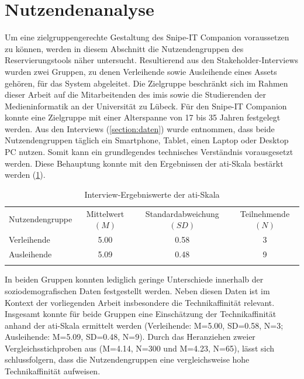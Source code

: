 \section{Nutzendenanalyse}
\label{section:Nutzenden}
Um eine zielgruppengerechte Gestaltung des Snipe-IT Companion voraussetzen zu können, werden in
diesem Abschnitt die Nutzendengruppen des Reservierungstools näher untersucht. Resultierend aus den
Stakeholder-Interviews wurden zwei Gruppen, zu denen Verleihende sowie Ausleihende eines Assets
gehören, für das System abgeleitet. Die Zielgruppe beschränkt sich im Rahmen dieser Arbeit auf die
Mitarbeitenden des \ac{imis} sowie die Studierenden der Medieninformatik an der Universität zu
Lübeck. Für den Snipe-IT Companion konnte eine Zielgruppe mit einer Alterspanne von 17 bis 35 Jahren
festgelegt werden. Aus den Interviews (\ref{section:daten}) wurde entnommen, dass beide
Nutzendengruppen täglich ein Smartphone, Tablet, einen Laptop oder Desktop PC nutzen. Somit kann ein
grundlegendes technisches Verständnis vorausgesetzt werden. Diese Behauptung konnte mit den
Ergebnissen der \ac{ati}-Skala bestärkt werden (\ref{table:ati}).

\begin{table}[h]
        \centering
        \caption{Interview-Ergebniswerte der \ac{ati}-Skala}
        \begin{tabular}{lccc}
                \arrayrulecolor{maincolor}\hline
                \sffamily\color{maincolor}Nutzendengruppe &
                \sffamily\color{maincolor}Mittelwert $(M)$
                                                          & \sffamily\color{maincolor}Standardabweichung $(SD)$ &
                \sffamily\color{maincolor}Teilnehmende $(N)$
                \\
                \arrayrulecolor{maincolor}\hline
                Verleihende                               & 5.00
                                                          & 0.58                                                & 3
                \\
                Ausleihende                               & 5.09
                                                          & 0.48                                                & 9
                \\
                \arrayrulecolor{maincolor}\hline
        \end{tabular}
        \label{table:ati}
\end{table}

In beiden Gruppen konnten lediglich geringe Unterschiede innerhalb der
soziodemografischen Daten festgestellt werden. Neben diesen Daten ist im Kontext
der vorliegenden Arbeit insbesondere die Technikaffinität relevant. Insgesamt
konnte für beide Gruppen eine Einschätzung der Technikaffinität anhand der
\ac{ati}-Skala ermittelt werden (Verleihende: M=5.00, SD=0.58, N=3; Ausleihende:
M=5.09, SD=0.48, N=9). Durch das Heranziehen zweier Vergleichsstichproben aus
 (M=4.14, N=300 und M=4.23, N=65), lässt sich
schlussfolgern, dass die Nutzendengruppen eine vergleichsweise hohe
Technikaffinität aufweisen.


